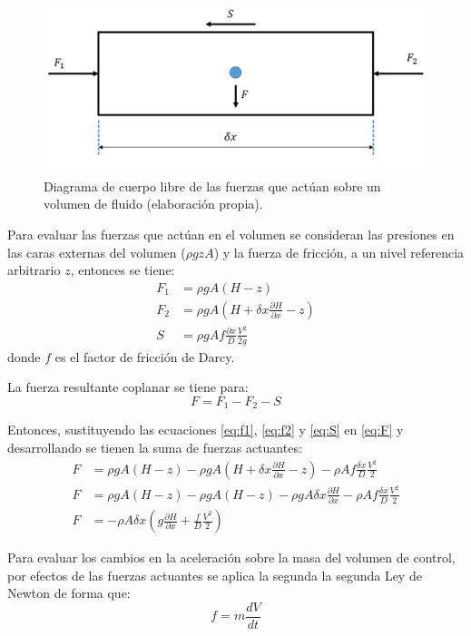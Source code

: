 \documentclass[letterpaper]{report}
\begin{document}
\begin{figure}[H]
	\centering
	\includegraphics[width=0.7\linewidth]{fig19}
	\caption{Diagrama de cuerpo libre de las fuerzas que actúan sobre un volumen de fluido (elaboración propia).}
	\label{fig:fig19}
\end{figure}

Para evaluar las fuerzas que actúan en el volumen se consideran las presiones en las caras externas del volumen ($\rho gzA$) y la fuerza de fricción, a un nivel referencia arbitrario $z$, 
entonces se tiene:
\begin{align}
	F_1 & = \rho g A (H-z) \label{eq:f1}\\
	F_2 & = \rho g A \left( H + \delta x \frac{\partial H}{\partial x} -z \right) \label{eq:f2}\\
	S &= \rho g A f \frac{\partial x}{D}\frac{V^2}{2g} \label{eq:S}
\end{align}
donde $f$ es el factor de fricción de Darcy.\bigskip

La fuerza resultante coplanar se tiene para:
\begin{equation}
	 F=F_1-F_2-S
\label{eq:F}
\end{equation}

Entonces, sustituyendo las ecuaciones \ref{eq:f1}, \ref{eq:f2} y \ref{eq:S} en \ref{eq:F} y desarrollando se tienen la suma de fuerzas actuantes:
\begin{equation}
	\begin{aligned}
		F &=\rho g A(H-z) -\rho g A \left(H + \delta x \frac{\partial H}{\partial x} -z \right) -\rho A f \frac{\delta x}{D} \frac{V^2}{2} \\
				F & =\rho g A(H-z)-\rho g A(H-z)-\rho gA\delta x\frac{\partial H}{\partial x}-\rho Af\frac{\delta x}{D}\frac{V^2}{2}\\
		F & =-\rho A\delta x\left(g\frac{\partial H}{\partial x}+\frac{f}{D}\frac{V^2}{2}\right)
	\end{aligned}
	\label{eq:FF}
\end{equation}

Para evaluar los cambios en la aceleración sobre la masa del volumen de control, por efectos de las fuerzas actuantes se aplica la segunda la segunda Ley de Newton de forma que:
\begin{equation}
	f = m\frac{dV}{dt}
\label{eq:2da}
\end{equation}
\end{document}
